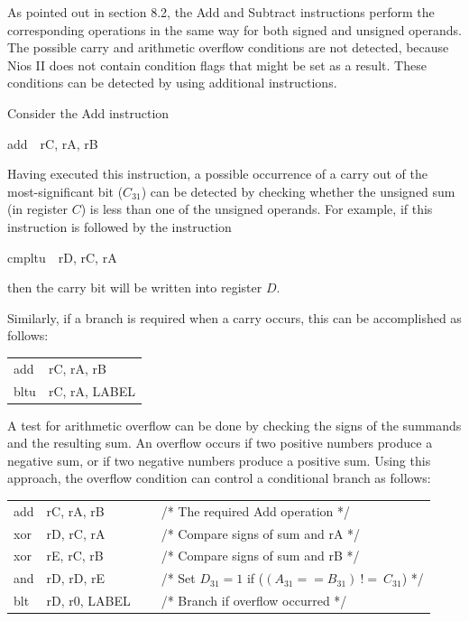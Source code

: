 \documentclass[11pt, twoside, pdftex]{article}
\begin{document}
As pointed out in section 8.2, the Add and Subtract instructions perform the corresponding operations
in the same way for both signed and unsigned operands. The possible carry and arithmetic overflow
conditions are not detected, because Nios II does not contain condition flags that might be set as
a result. These conditions can be detected by using additional instructions.
 

Consider the Add instruction
\begin{center}
{\sf add~~rC, rA, rB}
\end{center}
\noindent
Having executed this instruction, a possible occurrence of a carry out of the most-significant
bit ($C_{31}$) can be detected by checking whether the unsigned sum (in register $C$) is less than
one of the unsigned operands. For example, if this instruction is followed by the instruction
\begin{center}
{\sf cmpltu~~rD, rC, rA}
\end{center}
\noindent
then the carry bit will be written into register $D$.
 

\noindent
Similarly, if a branch is required when a carry occurs, this can be accomplished as follows:
\begin{center}
\begin{tabular}{ll}
{\sf add} & {\sf rC, rA, rB} \\
{\sf bltu} & {\sf rC, rA, LABEL}
\end{tabular}
\end{center}
 

A test for arithmetic overflow can be done by checking the signs of the summands and the resulting
sum. An overflow occurs if two positive numbers produce a negative sum, or if two negative numbers
produce a positive sum. Using this approach, the overflow condition can control a conditional
branch as follows:
\begin{center}
\begin{tabular}{lll}
{\sf add} & {\sf rC, rA, rB}~~~~~~~ & /* The required Add operation */ \\
{\sf xor} & {\sf rD, rC, rA}  & /* Compare signs of sum and rA */ \\
{\sf xor} & {\sf rE, rC, rB}  & /* Compare signs of sum and rB */ \\
{\sf and} & {\sf rD, rD, rE}  & /* Set $D_{31} = 1$ if ($(A_{31} == B_{31})~!=~C_{31}$) */ \\
{\sf blt} & {\sf rD, r0, LABEL} & /* Branch if overflow occurred */
\end{tabular}
\end{center}
 
\end{document}

